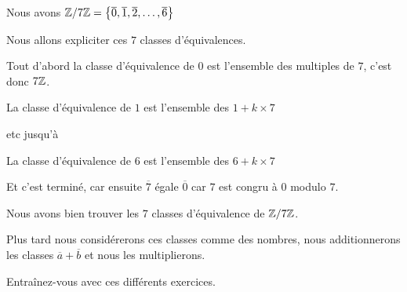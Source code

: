 Nous avons $\mathbb{Z}/7\mathbb{Z} = \big\{  \overline 0, \overline 1, \overline 2,\ldots, \overline{6} \big\}$


Nous allons expliciter ces $7$ classes d'équivalences.

\change

Tout d'abord la classe d'équivalence de $0$ est l'ensemble des multiples de $7$, c'est donc $7\mathbb{Z}$.

\change

La classe d'équivalence de $1$ est l'ensemble des $1+k \times 7$ 

\change

etc
jusqu'à 

La classe d'équivalence de $6$ est l'ensemble des $6+k \times 7$ 

\change

Et c'est terminé, car ensuite $\overline 7$
égale $\overline{0}$ car $7$ est congru à $0$ modulo $7$.

Nous avons bien trouver les $7$ classes d'équivalence de $\mathbb{Z}/7\mathbb{Z}$.

Plus tard nous considérerons ces classes comme des nombres, nous additionnerons 
les classes $\overline a + \overline b$ et nous les multiplierons.



\diapo

Entraînez-vous avec ces différents exercices.





